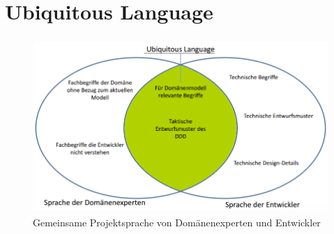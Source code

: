 %	
%

\section{Ubiquitous Language} \label{a.1.pic}
\begin{figure}[h]
	\centering
	\includegraphics[height=250px]{./appendix/filesONLYForAppendix/Images/ul.png}
	\caption{Gemeinsame Projektsprache von Domänenexperten und Entwickler}
	\label{Löwe}
\end{figure}

\newpage

